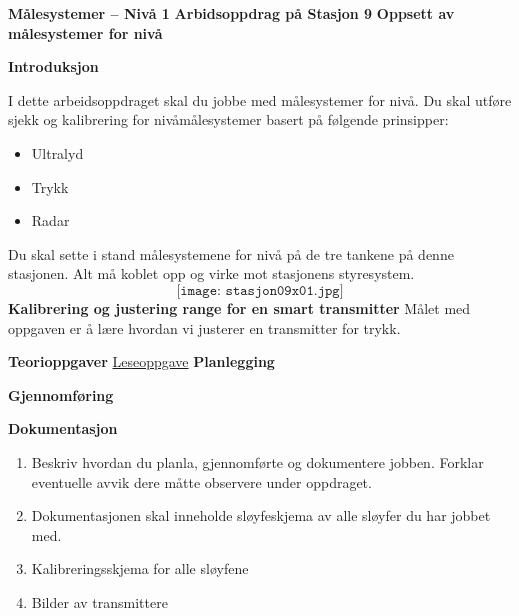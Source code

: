 

\noindent

\vskip 5pt

\vskip 5pt
\begin{center}
\textbf{Målesystemer -- Nivå 1 }
\vskip 5pt 
\textbf{Arbidsoppdrag på Stasjon 9}
\vskip 5pt 
\textbf{Oppsett av målesystemer for nivå}
\end{center}

\textbf{Introduksjon}

I dette arbeidsoppdraget skal du jobbe med målesystemer for nivå. Du skal utføre sjekk og kalibrering for nivåmålesystemer basert på følgende prinsipper:
\begin{itemize}[noitemsep]
	\item Ultralyd
	\item Trykk
	\item Radar
\end{itemize}
Du skal sette i stand målesystemene for nivå på de tre tankene på denne stasjonen. Alt må koblet opp og virke mot stasjonens styresystem. 
$$\texttt{[image: stasjon09x01.jpg]}$$
\textbf{Kalibrering og justering range for en smart transmitter}
Målet med oppgaven er å lære hvordan vi justerer en transmitter for trykk.


\vskip 5pt 

\textbf{Teorioppgaver}
\vskip 5pt 
\href {https://autofaget.no/level/node2.html} {Leseoppgave}
\vskip 5pt 
\textbf{Planlegging}
\vskip 5pt 


\textbf{Gjennomføring}
\vskip 5pt 

\textbf{Dokumentasjon}
\vskip 5pt 

\begin{enumerate}
	\item Beskriv hvordan du planla, gjennomførte og dokumentere jobben. Forklar eventuelle avvik dere måtte observere under oppdraget. 
	\item Dokumentasjonen skal inneholde sløyfeskjema av alle sløyfer du har jobbet med. 
	\item Kalibreringsskjema for alle sløyfene
	\item Bilder av transmittere
\end{enumerate}










\vfil 


\vfil \eject

















